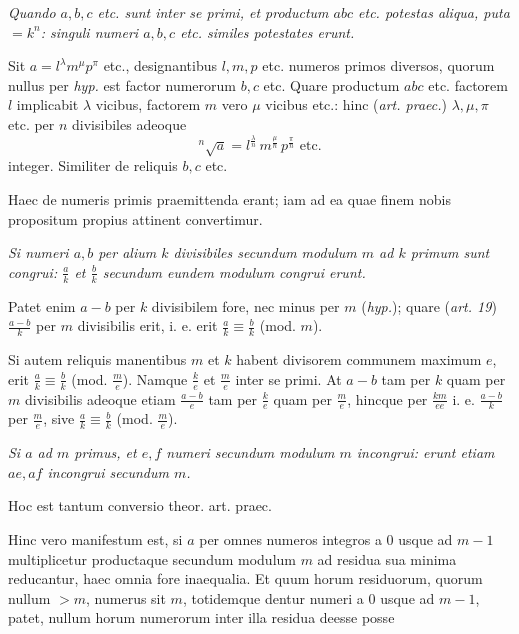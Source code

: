 

\emph{Quando $a, b, c$ etc. sunt inter se primi, et productum $abc$ etc. potestas aliqua,
puta $=k^n$: singuli numeri $a, b, c$ etc. similes potestates erunt.}

Sit $a = l^\lambda m^\mu p^\pi$ etc., designantibus $l, m, p$ etc. numeros primos diversos,
quorum nullus per \emph{hyp.} est factor numerorum $b, c$ etc. Quare productum $abc$ etc.
factorem $l$ implicabit $\lambda$ vicibus, factorem $m$ vero $\mu$ vicibus etc.: hinc
(\emph{art. praec.}) $\lambda, \mu, \pi$ etc. per $n$ divisibiles adeoque
\[
{}^{n}\!\surd a = l^{\frac{\lambda}{n}} \, m^{\frac{\mu}{n}} \, p^{\frac{\pi}{n}} \text{ etc.}
\]
integer. Similiter de reliquis $b, c$ etc.

Haec de numeris primis praemittenda erant; iam ad ea quae finem nobis propositum propius
attinent convertimur.


\emph{Si numeri $a, b$ per alium $k$ divisibiles secundum modulum $m$ ad $k$ primum sunt
congrui: $\frac{a}{k}$ et $\frac{b}{k}$ secundum eundem modulum congrui erunt.}

Patet enim $a-b$ per $k$ divisibilem fore, nec minus per $m$ (\emph{hyp.}); quare
(\emph{art. 19}) $\frac{a-b}{k}$ per $m$ divisibilis erit, i. e. erit
$\frac{a}{k} \equiv \frac{b}{k}$ (mod. $m$).

Si autem reliquis manentibus $m$ et $k$ habent divisorem communem maximum $e$, erit
$\frac{a}{k} \equiv \frac{b}{k}$ (mod. $\frac{m}{e}$). Namque $\frac{k}{e}$ et
$\frac{m}{e}$ inter se primi. At $a-b$ tam per $k$ quam per $m$ divisibilis adeoque etiam
$\frac{a-b}{e}$ tam per $\frac{k}{e}$ quam per $\frac{m}{e}$, hincque per $\frac{km}{ee}$
i. e. $\frac{a-b}{k}$ per $\frac{m}{e}$, sive $\frac{a}{k} \equiv \frac{b}{k}$ (mod.
$\frac{m}{e}$).


\emph{Si $a$ ad $m$ primus, et $e, f$ numeri secundum modulum $m$ incongrui: erunt etiam
$ae, af$ incongrui secundum $m$.}

Hoc est tantum conversio theor. art. praec.

Hinc vero manifestum est, si $a$ per omnes numeros integros a $0$ usque ad $m-1$
multiplicetur productaque secundum modulum $m$ ad residua sua minima reducantur, haec omnia
fore inaequalia. Et quum horum residuorum, quorum nullum $> m$, numerus sit $m$, totidemque
dentur numeri a $0$ usque ad $m-1$, patet, nullum horum numerorum inter illa residua deesse
posse

